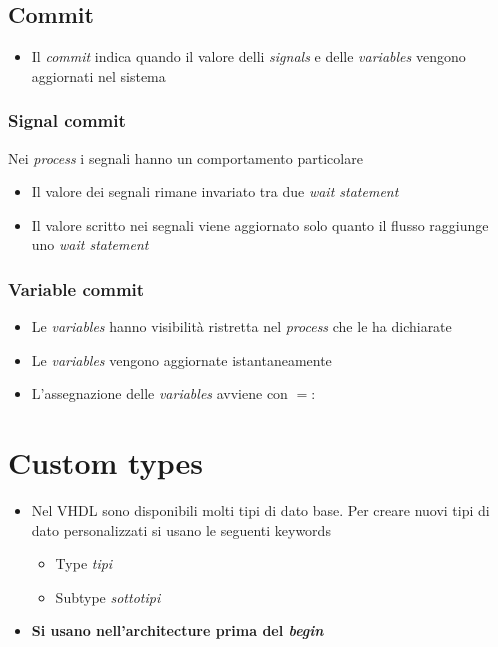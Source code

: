 \documentclass{article}
\begin{document}
\subsection{Commit}
\begin{itemize}
	\item Il \textit{commit} indica quando il valore delli \textit{signals} e delle \textit{variables} vengono aggiornati nel sistema
\end{itemize}
\subsubsection{Signal commit}
Nei \textit{process} i segnali hanno un comportamento particolare
\begin{itemize}
	\item Il valore dei segnali rimane invariato tra due \textit{wait statement}
	\item Il valore scritto nei segnali viene aggiornato solo quanto il flusso raggiunge uno \textit{wait statement}
\end{itemize}
\subsubsection{Variable commit}
\begin{itemize}
	\item Le \textit{variables} hanno visibilità ristretta nel \textit{process} che le ha dichiarate
	\item Le \textit{variables} vengono aggiornate istantaneamente
	\item L'assegnazione delle \textit{variables} avviene con \(=:\)
\end{itemize}

\newpage 

\section{Custom types}
\begin{itemize}
	\item Nel VHDL sono disponibili molti tipi di dato base. Per creare nuovi tipi di dato personalizzati si usano le seguenti keywords
	      \begin{itemize}
	      	\item Type \textit{tipi}
	      	\item Subtype \textit{sottotipi}
	      \end{itemize}
	\item \textbf{Si usano nell'architecture prima del \textit{begin}}
\end{itemize}
\end{document}
